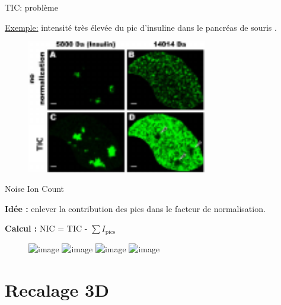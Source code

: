 \documentclass[10pt]{beamer}
\begin{document}
\begin{frame}{TIC: problème}

  \underline{Exemple:} intensité très élevée du pic d'insuline dans le
  pancréas de souris \cite{Deininger_2011}.

  \begin{figure}[ht]
    \centering
    \includegraphics[width=0.7\textwidth]{fig/normalization_defect}
    \caption{}
    \label{fig:normalization_defect}
  \end{figure}

\end{frame}


\begin{frame}{Noise Ion Count}

  \textbf{Idée :} enlever la contribution des pics dans le facteur de
  normalisation.

  \textbf{Calcul :} NIC = TIC - $\sum I_{\text{pics}}$

  \vspace{0.4cm}

  \begin{figure}[ht]
    \centering
    \includegraphics<1>[width=0.7\textwidth]{fig/normalization2}%
    \includegraphics<2>[width=0.7\textwidth]{fig/normalization_sic1}%
    \includegraphics<3>[width=0.7\textwidth]{fig/normalization_sic2}%
    \includegraphics<4>[width=0.7\textwidth]{fig/normalization_sic3}%
    \caption{}
    \label{fig:normalization_sic1}
  \end{figure}


\end{frame}


\section{Recalage 3D}
\end{document}
